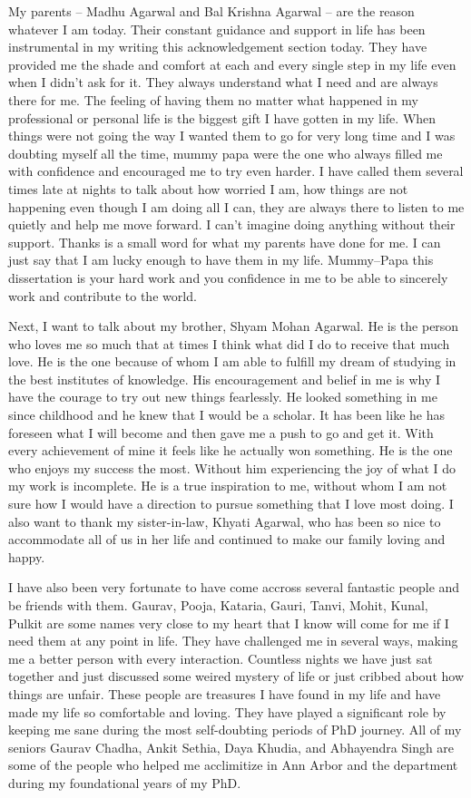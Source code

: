 My parents -- Madhu Agarwal and Bal Krishna Agarwal -- are the reason whatever I
am today. Their constant guidance and support in life has been instrumental in
my writing this acknowledgement section today. They have provided me the shade
and comfort at each and every single step in my life even when I didn't ask for
it. They always understand what I need and are always there for me. The feeling
of having them no matter what happened in my professional or personal life is
the biggest gift I have gotten in my life. When things were not going the way I
wanted them to go for very long time and I was doubting myself all the time,
mummy papa were the one who always filled me with confidence and encouraged me
to try even harder. I have called them several times late at nights to talk about
how worried I am, how things are not happening even though I am doing all I can,
they are always there to listen to me quietly and help me move forward. I can't
imagine doing anything without their support. Thanks is a small word for what my
parents have done for me. I can just say that I am lucky enough to have them in
my life. Mummy--Papa this dissertation is your hard work and you confidence in
me to be able to sincerely work and contribute to the world.

Next, I want to talk about my brother, Shyam Mohan Agarwal. He is the person who
loves me so much that at times I think what did I do to receive that much love.
He is the one because of whom I am able to fulfill my dream of studying in
the best institutes of knowledge. His encouragement and belief in me is why I
have the courage to try out new things fearlessly. He looked something in me
since childhood and he knew that I would be a scholar. It has been like he has
foreseen what I will become and then gave me a push to go and get it. With every
achievement of mine it feels like he actually won something. He is the one who
enjoys my success the most. Without him experiencing the joy of what I do my
work is incomplete. He is a true inspiration to me, without whom I am not sure
how I would have a direction to pursue something that I love most doing. I also
want to thank my sister-in-law, Khyati Agarwal, who has been so nice to
accommodate all of us in her life and continued to make our family loving and
happy.

I have also been very fortunate to have come accross several fantastic people and be
friends with them. Gaurav, Pooja, Kataria, Gauri, Tanvi, Mohit, Kunal, Pulkit
are some names very close to my heart that I know will come for me if I need
them at any point in life. They have challenged me in several ways, making me a
better person with every interaction. Countless nights we have just sat together
and just discussed some weired mystery of life or just cribbed about how things
are unfair. These people are treasures I have found in my life and have made my
life so comfortable and loving. They have played a significant role by keeping
me sane during the most self-doubting periods of PhD journey. All of my seniors
Gaurav Chadha, Ankit Sethia, Daya Khudia, and Abhayendra Singh are some of the
people who helped me acclimitize in Ann Arbor and the department during my
foundational years of my PhD.

